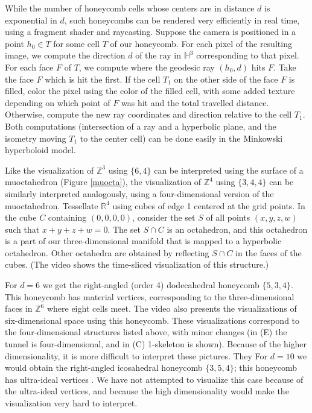 \documentclass{article}
\def\bbZ{\mathbb{Z}}
\def\bbR{\mathbb{R}}
\def\bbH{\mathbb{H}}
\begin{document}
While the number of honeycomb cells whose centers are in distance $d$ is exponential in $d$, such honeycombs can be rendered 
very efficiently in real time, using a fragment shader and raycasting. Suppose the camera is positioned in a point $h_0 \in T$ for some
cell $T$ of our honeycomb. For each pixel of the resulting image, we compute the direction $d$ of the ray in $\bbH^3$ corresponding to that pixel. For each face $F$
of $T$, we compute where the geodesic ray $(h_0,d)$ hits $F$. Take the face $F$ which is hit the first. If the cell $T_1$ on the other side
of the face $F$ is filled, color the pixel using the color of the filled cell, with some added texture depending on which point of $F$ was
hit and the total travelled distance. Otherwise, compute the new ray coordinates and direction relative to the cell $T_1$. 
Both computations (intersection of a ray and a hyperbolic plane, and the isometry moving $T_1$ to the center cell) can be done easily
in the Minkowski hyperboloid model.

Like the visualization of $\mathbb{Z}^3$ using $\{6,4\}$ can be interpreted using the surface of a muoctahedron (Figure \ref{muocta}), 
the visualization of $\bbZ^4$ using $\{3,4,4\}$ can be similarly interpreted analogously, using a four-dimensional version of the muoctahedron.
Tessellate $\bbR^4$ using cubes of edge 1 centered at the grid points. In the cube $C$ containing $(0,0,0,0)$, consider the set $S$ of 
all points $(x,y,z,w)$ such that $x+y+z+w=0$. The set $S \cap C$ is an octahedron, and this octahedron is a part of our three-dimensional
manifold that is mapped to a hyperbolic octahedron. Other octahedra are obtained by reflecting $S \cap C$ in the faces of the cubes.
(The video shows the time-sliced visualization of this structure.)

For $d=6$ we get the right-angled (order 4) dodecahedral honeycomb $\{5,3,4\}$. This honeycomb has material vertices, corresponding to 
the three-dimensional faces in $\bbZ^6$ where eight cells meet. The video also presents the visualizations of 
six-dimensional space using this honeycomb. These visualizations correspond to the four-dimensional structures 
listed above, with minor changes (in (E) the tunnel is four-dimensional, and in (C) 1-skeleton is shown). Because of the higher dimensionality,
it is more difficult to interpret these pictures. They 
For $d=10$ we would obtain the right-angled icosahedral
honeycomb $\{3,5,4\}$; this honeycomb has ultra-ideal vertices \cite{hhoney}. We have not attempted to visualize this case
because of the ultra-ideal vertices, and because the high dimensionality would make the visualization very hard to interpret.
\end{document}
